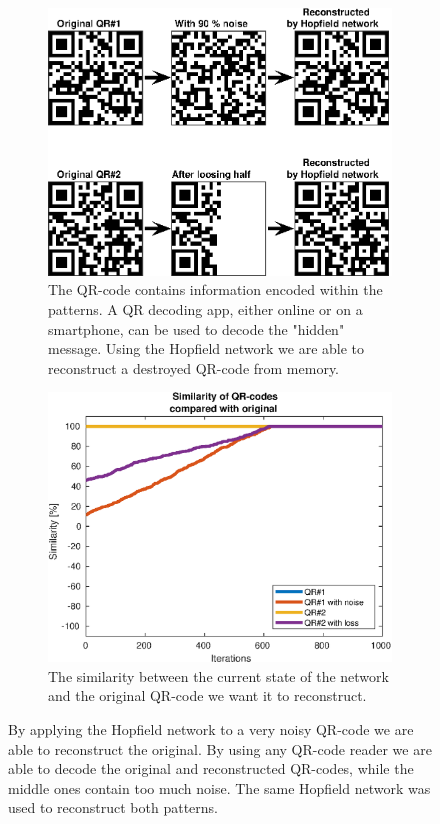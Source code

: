 \begin{figure}[H]
    \centering
    \captionsetup[subfigure]{width=0.9\textwidth, justification=raggedright}
    \begin{subfigure}{0.49\textwidth}
        \includegraphics[width=\textwidth]{figs/qr-code}
        \caption{The QR-code contains information encoded within the patterns. A QR decoding app, either online or on a smartphone, can be used to decode the "hidden" message. Using the Hopfield network we are able to reconstruct a destroyed QR-code from memory.}
        \label{fig:qr-codes}
    \end{subfigure}
    \begin{subfigure}{0.49\textwidth}
        \includegraphics[width=\textwidth]{figs/qr-code-sim}
        \caption{The similarity between the current state of the network and the original QR-code we want it to reconstruct.}
        \label{fig:qr-codes-stability}
    \end{subfigure}
    \caption{By applying the Hopfield network to a very noisy QR-code we are able to reconstruct the original. By using any QR-code reader we are able to decode the original and reconstructed QR-codes, while the middle ones contain too much noise. The same Hopfield network was used to reconstruct both patterns.}
\end{figure}

